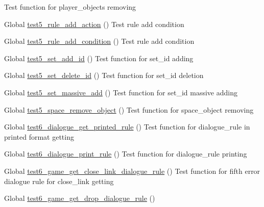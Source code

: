 \begin{DoxyRefList}
%
Test function for player\+\_\+objects removing  
\item[Global \mbox{\hyperlink{rule__test_8c_ace3d3c315fdee4bceb2b26ccb42a81cd}{test5\+\_\+rule\+\_\+add\+\_\+action}} ()]\label{test__test000629}%
%
Test rule add condition  
\item[Global \mbox{\hyperlink{rule__test_8c_af478f53272f4323e15de8ad17a9c8664}{test5\+\_\+rule\+\_\+add\+\_\+condition}} ()]\label{test__test000623}%
%
Test rule add condition  
\item[Global \mbox{\hyperlink{set__test_8c_a56d7b1848209c1dd9cd1a33933a8f73e}{test5\+\_\+set\+\_\+add\+\_\+id}} ()]\label{test__test000639}%
%
Test function for set\+\_\+id adding  
\item[Global \mbox{\hyperlink{set__test_8c_ae8a1c87d752ccde162a9cff877b779b2}{test5\+\_\+set\+\_\+delete\+\_\+id}} ()]\label{test__test000649}%
%
Test function for set\+\_\+id deletion  
\item[Global \mbox{\hyperlink{set__test_8c_a532c4abb8b38871ae1bfb67f1eb3edcc}{test5\+\_\+set\+\_\+massive\+\_\+add}} ()]\label{test__test000644}%
%
Test function for set\+\_\+id massive adding  
\item[Global \mbox{\hyperlink{space__test_8c_af3de11e12282273e9107e89f9214cbee}{test5\+\_\+space\+\_\+remove\+\_\+object}} ()]\label{test__test000689}%
%
Test function for space\+\_\+object removing  
\item[Global \mbox{\hyperlink{dialogue__test_8c_affdda78e7abaa544c57a51e1ae47be87}{test6\+\_\+dialogue\+\_\+get\+\_\+printed\+\_\+rule}} ()]\label{test__test000072}%
%
Test function for dialogue\+\_\+rule in printed format getting  
\item[Global \mbox{\hyperlink{dialogue__test_8c_a0b3c81ee9b28fdee61ec881443a81aa6}{test6\+\_\+dialogue\+\_\+print\+\_\+rule}} ()]\label{test__test000062}%
%
Test function for dialogue\+\_\+rule printing  
\item[Global \mbox{\hyperlink{game__test_8c_a8def93d3c38ae2516e4bb650eaa6c870}{test6\+\_\+game\+\_\+get\+\_\+close\+\_\+link\+\_\+dialogue\+\_\+rule}} ()]\label{test__test000382}%
%
Test function for fifth error dialogue rule for close\+\_\+link getting  
\item[Global \mbox{\hyperlink{game__test_8c_a69a7122d38fc878948052693ed3742bc}{test6\+\_\+game\+\_\+get\+\_\+drop\+\_\+dialogue\+\_\+rule}} ()]\label{test__test000349}%

\end{DoxyRefList}
